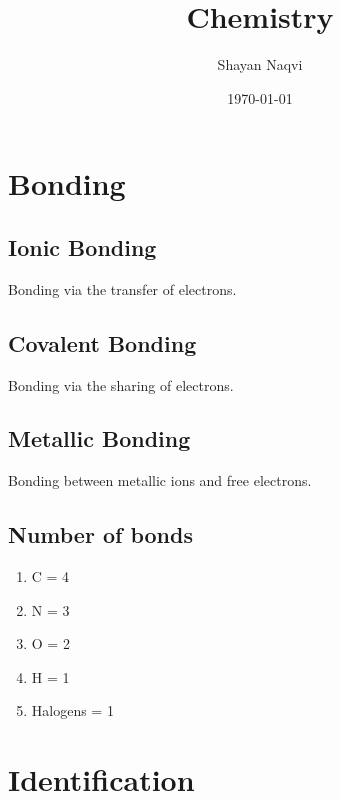 \documentclass[11pt]{article}
\author{Shayan Naqvi}
\date{\today}
\title{Chemistry}
\begin{document}
\maketitle
\tableofcontents

\section{Bonding}
\label{sec:org28b644c}
\subsection{Ionic Bonding}
\label{sec:org5a51af9}
Bonding via the transfer of electrons.
\subsection{Covalent Bonding}
\label{sec:org35d83dc}
Bonding via the sharing of electrons.
\subsection{Metallic Bonding}
\label{sec:org84e01bc}
Bonding between metallic ions and free electrons.
\subsection{Number of bonds}
\label{sec:org819ec1e}
\begin{enumerate}
\item C = 4
\item N = 3
\item O = 2
\item H = 1
\item Halogens = 1
\end{enumerate}
\section{Identification}
\label{sec:org131db2f}
\end{document}
